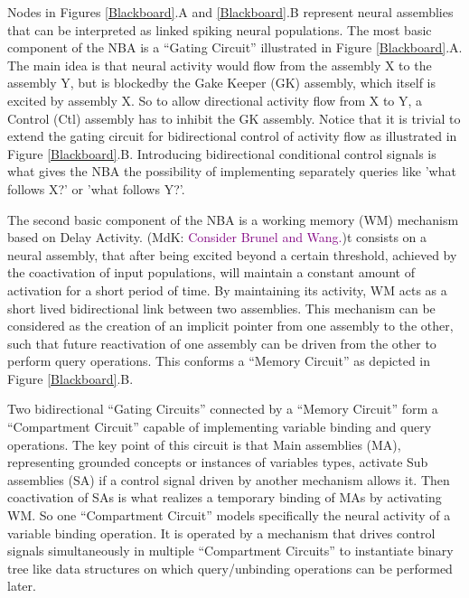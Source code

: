 \documentclass[10pt]{article}
\newcommand{\notenewMdK}[2]{(MdK: \textcolor{purple}{#1})}
\begin{document}
Nodes in Figures {\ref{Blackboard}}.A and {\ref{Blackboard}}.B represent neural assemblies that can be interpreted as linked spiking neural populations.
The most basic component of the NBA is a ``Gating Circuit'' illustrated in Figure {\ref{Blackboard}}.A.
The main idea is that neural activity would flow from the assembly X to the assembly Y, but is blockedby the Gake Keeper (GK) assembly, 
which itself is excited by assembly X.
So to allow directional activity flow from X to Y, a Control (Ctl) assembly has to inhibit the GK assembly.
Notice that it is trivial to extend the gating circuit for bidirectional control of activity flow as illustrated in Figure {\ref{Blackboard}}.B.
Introducing bidirectional conditional control signals is what gives the NBA the possibility of implementing separately queries like 'what follows X?' or 'what follows Y?'.

The second basic component of the NBA is a working memory (WM) mechanism based on Delay Activity\cite{de_Kamps_2005}. \notenewMdK{Consider Brunel and Wang.}
It consists on a neural assembly, that after being excited beyond a certain threshold, achieved by the coactivation of input populations, will maintain a constant amount of activation for a short period of time. By maintaining its activity, WM acts as a short lived bidirectional link between two assemblies. This mechanism can be considered as the creation of an implicit pointer from one assembly to the other, such that future reactivation of one assembly can be driven from the other to perform query operations. This conforms a ``Memory Circuit'' as depicted in Figure {\ref{Blackboard}}.B.

Two bidirectional ``Gating Circuits'' connected by a ``Memory Circuit'' form a ``Compartment Circuit'' capable of implementing variable binding and query operations.
The key point of this circuit is that Main assemblies (MA), representing grounded concepts or instances of variables types, activate Sub assemblies (SA) 
if a control signal driven by another mechanism allows it.
Then coactivation of SAs is what realizes a temporary binding of MAs by activating WM.
So one ``Compartment Circuit'' models specifically the neural activity of a variable binding operation.
It is operated by a mechanism that drives control signals simultaneously in multiple ``Compartment Circuits'' to instantiate binary tree like data structures on which query/unbinding operations can be performed later. 
\end{document}
